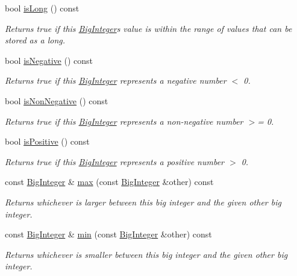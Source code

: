 \begin{DoxyCompactItemize}
bool \mbox{\hyperlink{classBigInteger_ae7ab3b45a738cd32270fcdea36953c7b}{is\+Long}} () const
\begin{DoxyCompactList}\small\item\em Returns true if this \mbox{\hyperlink{classBigInteger}{Big\+Integer}}\textquotesingle{}s value is within the range of values that can be stored as a long. \end{DoxyCompactList}\item 
bool \mbox{\hyperlink{classBigInteger_ac14adf29c832575388e1b999a4bd60f5}{is\+Negative}} () const
\begin{DoxyCompactList}\small\item\em Returns true if this \mbox{\hyperlink{classBigInteger}{Big\+Integer}} represents a negative number $<$ 0. \end{DoxyCompactList}\item 
bool \mbox{\hyperlink{classBigInteger_a2f8d83e07bed3c6477d597a01fc1213d}{is\+Non\+Negative}} () const
\begin{DoxyCompactList}\small\item\em Returns true if this \mbox{\hyperlink{classBigInteger}{Big\+Integer}} represents a non-\/negative number $>$= 0. \end{DoxyCompactList}\item 
bool \mbox{\hyperlink{classBigInteger_acaa49d84bd269a22c83b15966a483572}{is\+Positive}} () const
\begin{DoxyCompactList}\small\item\em Returns true if this \mbox{\hyperlink{classBigInteger}{Big\+Integer}} represents a positive number $>$ 0. \end{DoxyCompactList}\item 
const \mbox{\hyperlink{classBigInteger}{Big\+Integer}} \& \mbox{\hyperlink{classBigInteger_a6d3e8559ebe8a6f0c8bebc756f4dd479}{max}} (const \mbox{\hyperlink{classBigInteger}{Big\+Integer}} \&other) const
\begin{DoxyCompactList}\small\item\em Returns whichever is larger between this big integer and the given other big integer. \end{DoxyCompactList}\item 
const \mbox{\hyperlink{classBigInteger}{Big\+Integer}} \& \mbox{\hyperlink{classBigInteger_ae62de36198a0dcb836fd8680e7d71c64}{min}} (const \mbox{\hyperlink{classBigInteger}{Big\+Integer}} \&other) const
\begin{DoxyCompactList}\small\item\em Returns whichever is smaller between this big integer and the given other big integer. \end{DoxyCompactList}\item 

\end{DoxyCompactItemize}
